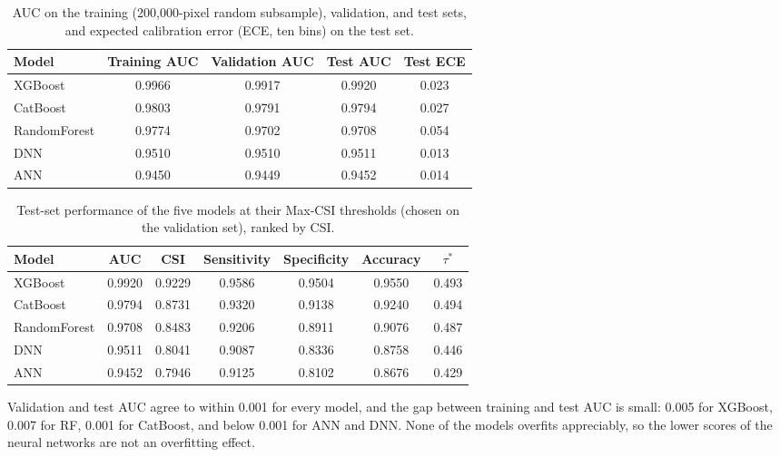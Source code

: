 \documentclass[12pt, a4paper]{article}
\begin{document}
\begin{table}[H]
\centering
\caption{AUC on the training (200,000-pixel random subsample), validation, and test sets, and expected calibration error (ECE, ten bins) on the test set.}
\label{tab:training}
\begin{adjustbox}{max width=\linewidth}
\begin{tabular}{lcccc}
\toprule
\textbf{Model} & \textbf{Training AUC} & \textbf{Validation AUC} & \textbf{Test AUC} & \textbf{Test ECE} \\
\midrule
XGBoost       & 0.9966 & 0.9917 & 0.9920 & 0.023 \\
CatBoost      & 0.9803 & 0.9791 & 0.9794 & 0.027 \\
RandomForest  & 0.9774 & 0.9702 & 0.9708 & 0.054 \\
DNN           & 0.9510 & 0.9510 & 0.9511 & 0.013 \\
ANN           & 0.9450 & 0.9449 & 0.9452 & 0.014 \\
\bottomrule
\end{tabular}
\end{adjustbox}
\end{table}

\begin{table}[H]
\centering
\caption{Test-set performance of the five models at their Max-CSI thresholds (chosen on the validation set), ranked by CSI.}
\label{tab:results}
\begin{adjustbox}{max width=\linewidth}
\begin{tabular}{lcccccc}
\toprule
\textbf{Model} & \textbf{AUC} & \textbf{CSI} & \textbf{Sensitivity} & \textbf{Specificity} & \textbf{Accuracy} & \textbf{$\tau^*$} \\
\midrule
XGBoost       & 0.9920 & 0.9229 & 0.9586 & 0.9504 & 0.9550 & 0.493 \\
CatBoost      & 0.9794 & 0.8731 & 0.9320 & 0.9138 & 0.9240 & 0.494 \\
RandomForest  & 0.9708 & 0.8483 & 0.9206 & 0.8911 & 0.9076 & 0.487 \\
DNN           & 0.9511 & 0.8041 & 0.9087 & 0.8336 & 0.8758 & 0.446 \\
ANN           & 0.9452 & 0.7946 & 0.9125 & 0.8102 & 0.8676 & 0.429 \\
\bottomrule
\end{tabular}
\end{adjustbox}
\end{table}

Validation and test AUC agree to within 0.001 for every model, and the gap between training and test AUC is small: 0.005 for XGBoost, 0.007 for RF, 0.001 for CatBoost, and below 0.001 for ANN and DNN. None of the models overfits appreciably, so the lower scores of the neural networks are not an overfitting effect.
\end{document}
